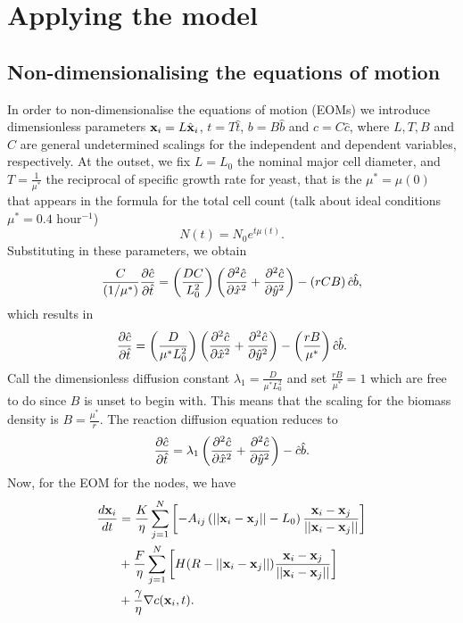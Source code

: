 
\chapter{Applying the model}

\section{Non-dimensionalising the equations of motion}
In order to non-dimensionalise the equations of motion (EOMs) we
introduce dimensionless parameters $\vb{x}_i = L\hat{\vb{x}}_i$, $t = T \hat{t}$, $b = B \hat{b}$
and $c = C \hat{c}$, where $L, T, B$ and $C$ are general undetermined scalings for the independent 
and dependent variables, respectively. At the outset, we fix $L = L_0$ the nominal major cell diameter, and
$ T = \frac{1}{\mu^*}$ the reciprocal of specific growth rate for yeast, that is the $\mu^* = \mu(0)$ that appears in
the formula for the total cell count (talk about ideal conditions $\mu^* = 0.4$ hour$^{-1}$)
\begin{equation*}  
    N(t) = N_0 e^{ t \mu(t)}.
\end{equation*}
Substituting in these parameters, we obtain 
\begin{equation*}
    \frac{C}{(1/\mu^*)}\pdv{\hat{c}}{\hat{t}} = \left(\frac{D C}{ L_0^2} \right)\left(\pdv[2]{\hat{c}}{\hat{x}} + \pdv[2]{\hat{c}}{\hat{y}} \right) -
      \left( r C B\right)  \hat{c}\hat{b},
\end{equation*}
which results in 
\begin{equation*}
    \pdv{\hat{c}}{\hat{t}} = \left(\frac{D}{ \mu^* L_0^2} \right)\left(\pdv[2]{\hat{c}}{\hat{x}} + \pdv[2]{\hat{c}}{\hat{y}} \right) -
      \left( \frac{r  B}{\mu^*}\right)  \hat{c}\hat{b}.
\end{equation*}
Call the dimensionless diffusion constant $\lambda_1 = \frac{D}{ \mu^* L_0^2}$ and 
set $\frac{r  B}{\mu^*}=1$ which are free to do since $B$ is unset to begin with. This means 
that the scaling for the biomass density is $B = \frac{\mu^*}{r}$. The reaction diffusion equation 
reduces to 
\begin{equation*}
    \pdv{\hat{c}}{\hat{t}} = \lambda_1 \left(\pdv[2]{\hat{c}}{\hat{x}} + \pdv[2]{\hat{c}}{\hat{y}} \right) -
      \hat{c}\hat{b}.
\end{equation*}
Now, for the EOM for the nodes, we have
\begin{equation*}
    \begin{split}
        \frac{d \vb{x}_i}{dt} &= 
        \frac{K}{ \eta}\sum_{j = 1}^N   \left[ - A_{ij} \left( ||\vb{x}_i - \vb{x}_j|| - L_0\right) \frac{\vb{x}_i - \vb{x}_j}{||\vb{x}_i - \vb{x}_j||} \right]\\
         &+ \frac{F}{ \eta}\sum_{j = 1}^N \left[ H(R - ||\vb{x}_i - \vb{x}_j||) \frac{\vb{x}_i - \vb{x}_j}{||\vb{x}_i - \vb{x}_j||}     \right]\\ 
         &+ \frac{\gamma}{\eta} \nabla c (\vb{x}_i, t).
    \end{split}
\end{equation*}
